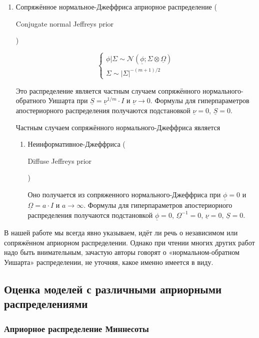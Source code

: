 \documentclass[11pt]{article} %
\newcommand{\cN}{\mathcal{N}}
\newcommand{\prior}{\underline}
\newcommand{\eng}[1]{\begin{otherlanguage}{english}#1\end{otherlanguage}}
\begin{document}
\begin{enumerate}
\begin{enumerate}
\item Сопряжённое нормальное-Джеффриса априорное распределение (\eng{Conjugate normal Jeffreys prior})


\begin{equation}
\begin{cases}
\phi | \Sigma \sim \cN(\prior\phi; \Sigma \otimes \prior\Omega ) \\
\Sigma \sim |\Sigma|^{-(m+1)/2}
\end{cases}
\end{equation}




Это распределение является частным случаем сопряжённого нормального-обратного Уишарта при $\prior S
= \prior \nu^{1/m}\cdot I$ и  $\prior \nu \to 0$.  Формулы для
гиперпараметров апостериорного распределения получаются подстановкой
$\prior\nu=0$, $\prior S=0$.


Частным случаем сопряжённого нормального-Джеффриса является

\begin{enumerate}

\item Неинформативное-Джеффриса (\eng{Diffuse Jeffreys prior})


Оно получается из сопряженного нормального-Джеффриса при $\prior\phi=0$ и
$\prior\Omega= a\cdot I$ и $a\to \infty$. Формулы для гиперпараметров
апостериорного распределения получаются подстановкой $\prior\phi=0$,
$\prior\Omega^{-1}=0$, $\prior\nu=0$, $\prior S=0$.

\end{enumerate}



\end{enumerate}


\end{enumerate}


В нашей работе мы всегда явно указываем, идёт ли речь о независимом
или сопряжённом априорном распределении. Однако при чтении многих
других работ надо быть внимательным, зачастую авторы говорят о
«нормальном-обратном Уишарта» распределении, не уточняя, какое  именно имеется
в виду.

\subsection{Оценка моделей с различными априорными распределениями}
\subsubsection{Априорное распределение Миннесоты}
\end{document}
